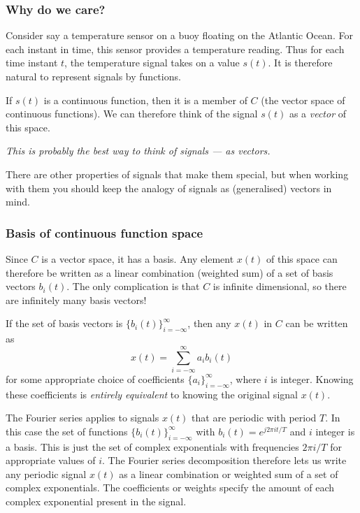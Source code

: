 \documentclass[10pt]{beamer}
\begin{document}
\begin{frame}
  \frametitle{Why do we care?}
  
  Consider say a temperature sensor on a buoy floating on the Atlantic Ocean.  For each instant in time, this sensor provides a temperature reading.  Thus for each time instant $t$, the temperature signal takes on a value $s(t)$.  It is therefore natural to represent signals by functions.  
  
  If $s(t)$ is a continuous function, then it is a member of $C$ (the vector space of continuous functions).  We can therefore think of the signal $s(t)$ as a {\em vector} of this space.  
  
  \begin{center}
  {\em This is probably the best way to think of signals --- as vectors.}  
  \end{center}
  
  There are other properties of signals that make them special, but when working with them you should keep the analogy of signals as (generalised) vectors in mind.
\end{frame}

\begin{frame}
  \frametitle{Basis of continuous function space}
  Since $C$ is a vector space, it has a basis.  Any element $x(t)$ of this space can therefore be written as a linear combination (weighted sum) of a set of basis vectors $b_i(t)$.  The only complication is that $C$ is infinite dimensional, so there are infinitely many basis vectors!
  
  If the set of basis vectors is $\{b_i(t)\}_{i=-\infty}^\infty$, then any $x(t)$ in $C$ can be written as
  \begin{equation*}
    x(t) = \sum_{i=-\infty}^\infty a_i b_i(t)
  \end{equation*}
  for some appropriate choice of coefficients $\{a_i\}_{i=-\infty}^\infty$, where $i$ is integer.  Knowing these coefficients is {\em entirely equivalent} to knowing the original signal $x(t)$.  
  
  The Fourier series applies to signals $x(t)$ that are periodic with period $T$.  In this case the set of functions $\{b_i(t)\}_{i=-\infty}^\infty$ with $b_i(t) = e^{j 2 \pi i t/T}$ and $i$ integer is a basis.  This is just the set of complex exponentials with frequencies $2 \pi i/T$ for appropriate values of $i$.  The Fourier series decomposition therefore lets us write any periodic signal $x(t)$ as a linear combination or weighted sum of a set of complex exponentials.  The coefficients or weights specify the amount of each complex exponential present in the signal.  
\end{frame}
\end{document}
